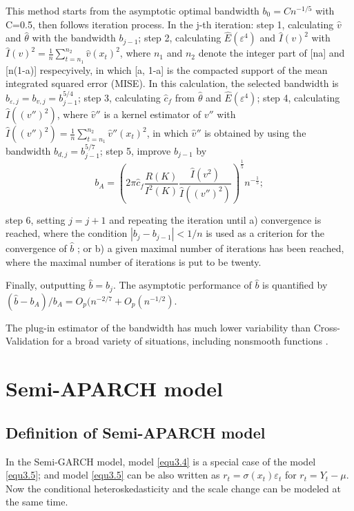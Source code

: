 This method starts from the asymptotic optimal bandwidth $b_{0}= Cn^{-1/5}$ with C=0.5, then follows iteration process. In the j-th iteration: step 1, calculating $\hat{v}$  and $\hat{\theta}$  with the bandwidth $b_{j-1}$; step 2, calculating $\hat{E}(\varepsilon^{4})$ and $\hat{I}(v)^{2}$  with   $\hat{I}(v)^{2} = \frac{1}{n}\sum_{t=n_{1}}^{n_{2}}\hat{v}(x_{t})^{2}$, where $n_{1}$  and $n_{2}$ denote the integer part of [na] and [n(1-a)] respecyively, in which [a, 1-a] is the compacted support of the mean integrated squared error (MISE). In this calculation, the selected bandwidth is $b_{\varepsilon,j}=b_{v,j}=b_{j-1}^{5/4}$; step 3, calculating $\hat{c}_{f}$  from $\hat{\theta}$  and $\hat{E}(\varepsilon^{4})$; step 4, calculating $\hat{I}((v'')^{2})$, where $\hat{v}''$  is a kernel estimator of   $v''$  with $\hat{I}((v'')^{2})= \frac{1}{n}\sum_{t=n_{1}}^{n_{2}}\hat{v}''(x_{t})^{2}$, in which $\hat{v}''$ is obtained by using the bandwidth $b_{d,j}=b_{j-1}^{5/7}$; step 5, improve $b_{j-1}$  by 
\[ b_{A} =(2\pi \hat{c}_{f} \frac{R(K)}{I^{2}(K)}\frac{\hat{I}(v^{2})}{\hat{I}((v'')^2)})^{\frac{1}{5}}n^{-\frac{1}{5}}; \]

step 6, setting $j=j+1$ and repeating the iteration until  a) convergence is reached, where the condition $|b_{j} - b_{j-1}| <1/n$  is used as a criterion for the convergence of $\hat{b}$ ; or b) a given maximal number of iterations has been reached, where the maximal number of iterations is put to be twenty. 

Finally, outputting $\hat{b} = b_{j}$. The asymptotic performance of $\hat{b}$ is quantified by $(\hat{b}-b_{A})/b_{A}=O_{p}(n^{-2/7}+O_{p}(n^{-1/2})$.

The plug-in estimator of the bandwidth has much lower variability than Cross- Validation for a broad variety of situations, including nonsmooth functions \citep{Gasser1991,Feng2004}.

\section{Semi-APARCH model}
\subsection{Definition of Semi-APARCH model}

In the Semi-GARCH model, model \ref{equ3.4} is a special case of the model \ref{equ3.5}; and model \ref{equ3.5} can be also written as $r_t= \sigma(x_t)\varepsilon_t$ for  $ r_{t}=Y_{t}-\mu$. Now the conditional heteroskedasticity and the scale change can be modeled at the same time.

